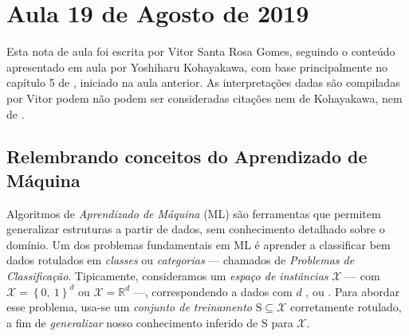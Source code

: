 \section{Aula 19 de Agosto de 2019}
\label{2019_08_19}

Esta nota de aula foi escrita por Vitor Santa Rosa Gomes, seguindo o conteúdo apresentado em aula por Yoshiharu Kohayakawa, com base principalmente no capítulo 5 de \cite[p.~129]{blum_hopcroft}, iniciado na aula anterior. As interpretações dadas são compiladas por Vitor podem não podem ser consideradas citações nem de Kohayakawa, nem de \cite{blum_hopcroft}.

\subsection*{Relembrando conceitos do Aprendizado de Máquina}

Algoritmos de \textit{Aprendizado de Máquina} (ML) são ferramentas que permitem generalizar estruturas a partir de dados, sem conhecimento detalhado sobre o domínio. Um dos problemas fundamentais em ML é aprender a classificar bem dados rotulados em \textit{classes} ou \textit{categorias} --- chamados de \textit{Problemas de Classificação}. Tipicamente, consideramos um \textit{espaço de instâncias} $\mathcal{X}$ --- com $\mathcal{X}=\left\{0,\ 1\right\}^d$ ou $\mathcal{X}=\mathds{R}^d$ ---, correspondendo a dados com $d$ ,  ou . Para abordar esse problema, usa-se um \textit{conjunto de treinamento} $\mathrm{S}\subseteq\mathcal{X}$ corretamente rotulado, a fim de \textit{generalizar} nosso conhecimento inferido de $\mathrm{S}$ para $\mathcal{X}$.

